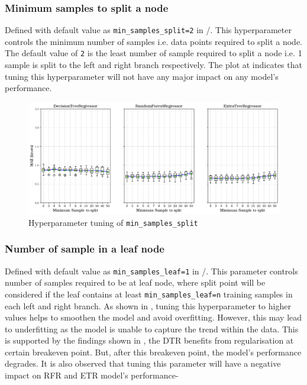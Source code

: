 \subsubsection*{Minimum samples to split a node}\label{sec:min_samples_split}

Defined with default value as {\tt min\_samples\_split=2} in \scikit/. This hyperparameter controls the minimum number of samples i.e. data points required to split a node. The default value of {\tt 2} is the least number of sample required to split a node i.e. 1 sample is split to the left and right branch respectively. The plot at  indicates that tuning this hyperparameter will not have any major impact on any model's performance.\\
\begin{figure}[h]
    \centering
        \includegraphics[width=.9\textwidth]{02_figures/hpo_min_samples_split_mae.png}
        \caption{Hyperparameter tuning of {\tt min\_samples\_split}}
        \label{fig:hpo_min_samples_split}
\end{figure}


\subsubsection*{Number of sample in a leaf node}\label{sec:min_samples_leaf}

Defined with default value as {\tt min\_samples\_leaf=1} in \scikit/. This parameter controls number of samples required to be at leaf node, where split point will be considered if the leaf contains at least {\tt min\_samples\_leaf=n} training samples in each left and right branch. As shown in , tuning this hyperparameter to higher values helps to smoothen the model and avoid overfitting. However, this may lead to underfitting as the model is unable to capture the trend within the data. This is supported by the findings shown in , the DTR benefits from regularisation at certain breakeven point. But, after this breakeven point, the model's performance degrades. It is also observed that tuning this parameter will have a negative impact on RFR and ETR model's performance-  


